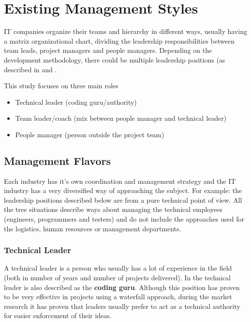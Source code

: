 \chapter{Existing Management Styles}
\label{chapter:existing}
IT companies  organize their teams and hierarchy in different ways, usually having a matrix organizational chart, dividing the leadership responsibilities between team leads, project managers and people managers. Depending on the development methodology, there could be multiple leadership positions (as described in \cite{abur-tl} and \cite{abur-pm}.

This study focuses on three main roles
\begin{itemize}
\item Technical leader (coding guru/authority)
\item Team leader/coach (mix between people manager and technical leader)
\item People manager (person outside the project team)

\end{itemize}
\section{Management Flavors}
\label{sec:flavours}
Each industry has it's own coordination and management strategy and the IT industry has a very diversified way of approaching the subject. For example: the leadership positions described below are from a pure technical point of view. All the tree situations describe ways about managing the technical employees (engineers, programmers and testers) and do not include the approaches used for the logistics, human resources or management departments.


\subsection{Technical Leader}
\label{sub-sec:tech-lead}
A technical leader is a person who usually has a lot of experience in the field (both in number of years and number of projects delivered). In \cite{abur-tl} the technical leader is also described as the \textbf{coding guru}. Although this position has proven to be very effective in projects using a waterfall approach, during the market research it has proven that leaders usually prefer to act as a technical authority for easier enforcement of their ideas.

